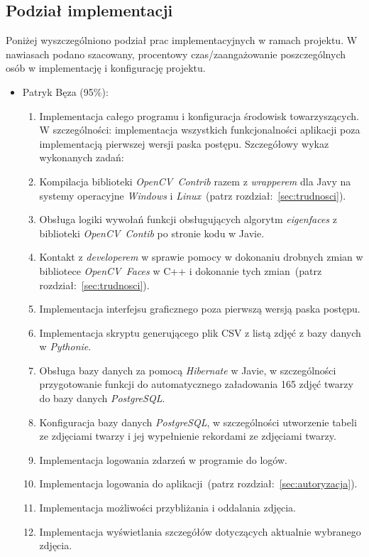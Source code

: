 \documentclass[a4paper,titlepage]{article}
\theoremstyle{break}
\numberwithin{equation}{subsection}
\begin{document}
\begin{appendices}
\subsection{Podział implementacji}

Poniżej wyszczególniono podział prac implementacyjnych w ramach projektu. W nawiasach podano szacowany, procentowy czas/zaangażowanie poszczególnych osób w implementację i konfigurację projektu.

\begin{itemize}
\item Patryk Bęza (95\%):
	\begin{enumerate}
		\item Implementacja całego programu i konfiguracja środowisk towarzyszących. W szczególności: implementacja wszystkich funkcjonalności aplikacji poza implementacją pierwszej wersji paska postępu. Szczegółowy wykaz wykonanych zadań:
		\item Kompilacja biblioteki \emph{OpenCV~Contrib} razem z \emph{wrapperem} dla Javy na systemy operacyjne \emph{Windows} i \emph{Linux}~(patrz rozdział:~\ref{sec:trudnosci}).
		\item Obsługa logiki wywołań funkcji obsługujących algorytm \emph{eigenfaces} z biblioteki \emph{OpenCV~Contib} po stronie kodu w Javie.
		\item Kontakt z \emph{developerem} w sprawie pomocy w dokonaniu drobnych zmian w bibliotece \emph{OpenCV~Faces} w C++ i dokonanie tych zmian~(patrz rozdział:~\ref{sec:trudnosci}).
		\item Implementacja interfejsu graficznego poza pierwszą wersją paska postępu.
		\item Implementacja skryptu generującego plik CSV z listą zdjęć z bazy danych w \emph{Pythonie}.
		\item Obsługa bazy danych za pomocą \emph{Hibernate} w Javie, w szczególności przygotowanie funkcji do automatycznego załadowania 165 zdjęć twarzy do bazy danych \emph{PostgreSQL}.
		\item Konfiguracja bazy danych \emph{PostgreSQL}, w szczególności utworzenie tabeli ze zdjęciami twarzy i jej wypełnienie rekordami ze zdjęciami twarzy.
		\item Implementacja logowania zdarzeń w programie do logów.
		\item Implementacja logowania do aplikacji~(patrz rozdział:~\ref{sec:autoryzacja}).
		\item Implementacja możliwości przybliżania i oddalania zdjęcia.
		\item Implementacja wyświetlania szczegółów dotyczących aktualnie wybranego zdjęcia.

\end{enumerate}
\end{itemize}
\end{appendices}
\end{document}
